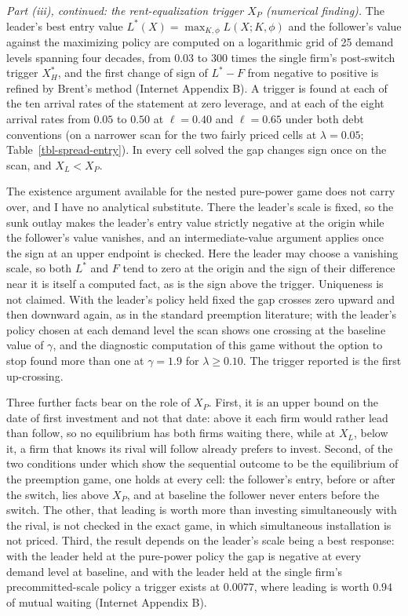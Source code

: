 \documentclass[
  11pt,
  letterpaper,
]{scrartcl}
\begin{document}
\emph{Part (iii), continued: the rent-equalization trigger \(X_P\)
(numerical finding).} The leader's best entry value
\(L^*(X) = \max_{K,\phi} L(X; K, \phi)\) and the follower's value
against the maximizing policy are computed on a logarithmic grid of 25
demand levels spanning four decades, from \(0.03\) to \(300\) times the
single firm's post-switch trigger \(X_H^*\), and the first change of
sign of \(L^* - F\) from negative to positive is refined by Brent's
method (Internet Appendix B). A trigger is found at each of the ten
arrival rates of the statement at zero leverage, and at each of the
eight arrival rates from \(0.05\) to \(0.50\) at \(\ell = 0.40\) and
\(\ell = 0.65\) under both debt conventions (on a narrower scan for the
two fairly priced cells at \(\lambda = 0.05\);
Table~\ref{tbl-spread-entry}). In every cell solved the gap changes sign
once on the scan, and \(X_L < X_P\).

The existence argument available for the nested pure-power game does not
carry over, and I have no analytical substitute. There the leader's
scale is fixed, so the sunk outlay makes the leader's entry value
strictly negative at the origin while the follower's value vanishes, and
an intermediate-value argument applies once the sign at an upper
endpoint is checked. Here the leader may choose a vanishing scale, so
both \(L^*\) and \(F\) tend to zero at the origin and the sign of their
difference near it is itself a computed fact, as is the sign above the
trigger. Uniqueness is not claimed. With the leader's policy held fixed
the gap crosses zero upward and then downward again, as in the standard
preemption literature; with the leader's policy chosen at each demand
level the scan shows one crossing at the baseline value of \(\gamma\),
and the diagnostic computation of this game without the option to stop
found more than one at \(\gamma = 1.9\) for \(\lambda \geq 0.10\). The
trigger reported is the first up-crossing.

Three further facts bear on the role of \(X_P\). First, it is an upper
bound on the date of first investment and not that date: above it each
firm would rather lead than follow, so no equilibrium has both firms
waiting there, while at \(X_L\), below it, a firm that knows its rival
will follow already prefers to invest. Second, of the two conditions
under which \citet{huisman2015strategic} show the sequential outcome to
be the equilibrium of the preemption game, one holds at every cell: the
follower's entry, before or after the switch, lies above \(X_P\), and at
baseline the follower never enters before the switch. The other, that
leading is worth more than investing simultaneously with the rival, is
not checked in the exact game, in which simultaneous installation is not
priced. Third, the result depends on the leader's scale being a best
response: with the leader held at the pure-power policy the gap is
negative at every demand level at baseline, and with the leader held at
the single firm's precommitted-scale policy a trigger exists at
\(0.0077\), where leading is worth \(0.94\) of mutual waiting (Internet
Appendix B).
\end{document}
